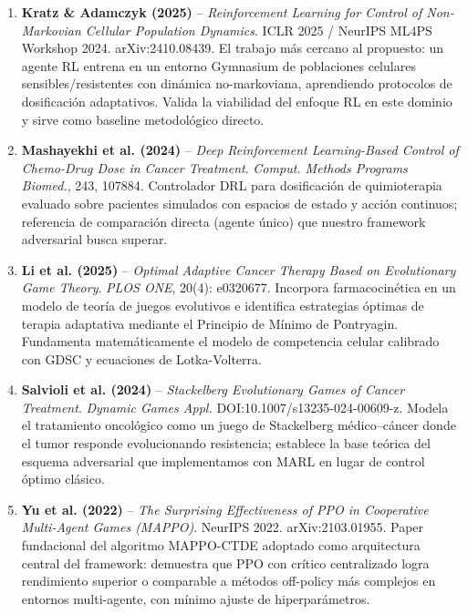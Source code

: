 \documentclass[a4paper,11pt]{article}
\begin{document}
\begin{enumerate}[leftmargin=*, itemsep=3pt, topsep=2pt]

  \item \textbf{Kratz \& Adamczyk (2025)} -- \textit{Reinforcement Learning for
  Control of Non-Markovian Cellular Population Dynamics}. ICLR 2025 /
  NeurIPS ML4PS Workshop 2024. arXiv:2410.08439. El trabajo más cercano al
  propuesto: un agente RL entrena en un entorno Gymnasium de poblaciones
  celulares sensibles/resistentes con dinámica no-markoviana, aprendiendo
  protocolos de dosificación adaptativos. Valida la viabilidad del
  enfoque RL en este dominio y sirve como baseline metodológico directo.

  \item \textbf{Mashayekhi et al. (2024)} -- \textit{Deep Reinforcement
  Learning-Based Control of Chemo-Drug Dose in Cancer Treatment}.
  \textit{Comput. Methods Programs Biomed.}, 243, 107884. Controlador DRL
  para dosificación de quimioterapia evaluado sobre pacientes simulados con
  espacios de estado y acción continuos; referencia de comparación directa
  (agente único) que nuestro framework adversarial busca superar.

  \item \textbf{Li et al. (2025)} -- \textit{Optimal Adaptive Cancer Therapy
  Based on Evolutionary Game Theory}. \textit{PLOS ONE}, 20(4): e0320677.
  Incorpora farmacocinética en un modelo de teoría de juegos evolutivos e
  identifica estrategias óptimas de terapia adaptativa mediante el Principio
  de Mínimo de Pontryagin. Fundamenta matemáticamente el modelo de
  competencia celular calibrado con GDSC y ecuaciones de Lotka-Volterra.

  \item \textbf{Salvioli et al. (2024)} -- \textit{Stackelberg Evolutionary
  Games of Cancer Treatment}. \textit{Dynamic Games Appl.}
  DOI:10.1007/s13235-024-00609-z. Modela el tratamiento oncológico como un
  juego de Stackelberg médico--cáncer donde el tumor responde evolucionando
  resistencia; establece la base teórica del esquema adversarial que
  implementamos con MARL en lugar de control óptimo clásico.

  \item \textbf{Yu et al. (2022)} -- \textit{The Surprising Effectiveness of
  PPO in Cooperative Multi-Agent Games (MAPPO)}. NeurIPS 2022.
  arXiv:2103.01955. Paper fundacional del algoritmo MAPPO-CTDE adoptado como
  arquitectura central del framework: demuestra que PPO con crítico
  centralizado logra rendimiento superior o comparable a métodos off-policy
  más complejos en entornos multi-agente, con mínimo ajuste de
  hiperparámetros.

\end{enumerate}
\end{document}
